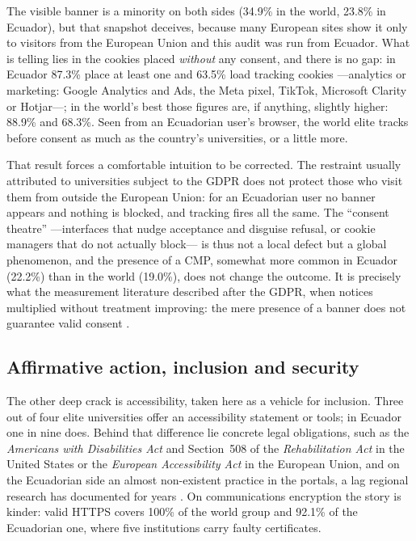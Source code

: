 \documentclass[pdflatex,sn-basic,Numbered]{sn-jnl}
\theoremstyle{thmstyleone}
\theoremstyle{thmstyletwo}
\theoremstyle{thmstylethree}
\begin{document}
The visible banner is a minority on both sides (34.9\% in the world, 23.8\% in Ecuador), but that snapshot deceives, because many European sites show it only to visitors from the European Union and this audit was run from Ecuador. What is telling lies in the cookies placed \emph{without} any consent, and there is no gap: in Ecuador 87.3\% place at least one and 63.5\% load tracking cookies ---analytics or marketing: Google Analytics and Ads, the Meta pixel, TikTok, Microsoft Clarity or Hotjar---; in the world's best those figures are, if anything, slightly higher: 88.9\% and 68.3\%. Seen from an Ecuadorian user's browser, the world elite tracks before consent as much as the country's universities, or a little more.

That result forces a comfortable intuition to be corrected. The restraint usually attributed to universities subject to the GDPR does not protect those who visit them from outside the European Union: for an Ecuadorian user no banner appears and nothing is blocked, and tracking fires all the same. The ``consent theatre'' ---interfaces that nudge acceptance and disguise refusal, or cookie managers that do not actually block--- is thus not a local defect but a global phenomenon, and the presence of a CMP, somewhat more common in Ecuador (22.2\%) than in the world (19.0\%), does not change the outcome. It is precisely what the measurement literature described after the GDPR, when notices multiplied without treatment improving: the mere presence of a banner does not guarantee valid consent \citep{degeling2019value,kretschmer2021cookie,nouwens2020dark,gray2021dark,habib2022okay}.

\subsection{Affirmative action, inclusion and security}
The other deep crack is accessibility, taken here as a vehicle for inclusion. Three out of four elite universities offer an accessibility statement or tools; in Ecuador one in nine does. Behind that difference lie concrete legal obligations, such as the \emph{Americans with Disabilities Act} \citep{ada1990} and Section~508 of the \emph{Rehabilitation Act} \citep{section508} in the United States or the \emph{European Accessibility Act} \citep{eaa2019} in the European Union, and on the Ecuadorian side an almost non-existent practice in the portals, a lag regional research has documented for years \citep{campoverdemolina2023accessibility,acostavargas2020dataset}. On communications encryption the story is kinder: valid HTTPS covers 100\% of the world group and 92.1\% of the Ecuadorian one, where five institutions carry faulty certificates.
\end{document}
